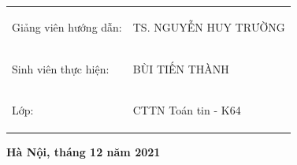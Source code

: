 \begin{titlepage}
\begin{minipage}{0.8\textwidth}
    
\vspace{2cm}

\begin{center}
\begin{tabular}{p{}l}
\begin{bfseries}Giảng viên hướng dẫn: \end{bfseries}& \begin{bfseries}TS. NGUYỄN HUY TRƯỜNG\end{bfseries}\\[0.2cm]
\begin{bfseries}Sinh viên thực hiện:\end{bfseries}& 
\begin{bfseries}BÙI TIẾN THÀNH\end{bfseries}\\[0.3cm]
\begin{bfseries}Lớp:\end{bfseries}& \begin{bfseries}CTTN Toán tin - K64\end{bfseries}\\
\end{tabular}
\end{center}
\vspace{2cm}
\begin{center}
    \textbf{Hà Nội, tháng 12 năm 2021}
\end{center}
\end{minipage}
\end{titlepage}

